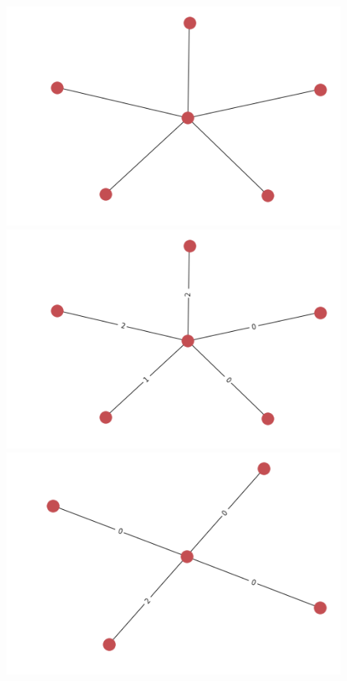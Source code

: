 \documentclass{article}
\theoremstyle{definition}
\begin{document}
\begin{figure}[!htb]
\begin{multicols}{4}
    \includegraphics[width=\linewidth]{data/generated-graphs/star_base.png}\par
    \includegraphics[width=\linewidth]{data/generated-graphs/star_labels.png}\par
    \includegraphics[width=\linewidth]{data/generated-graphs/star_altered_struct.png}\par

\end{multicols}
\end{figure}
\end{document}
